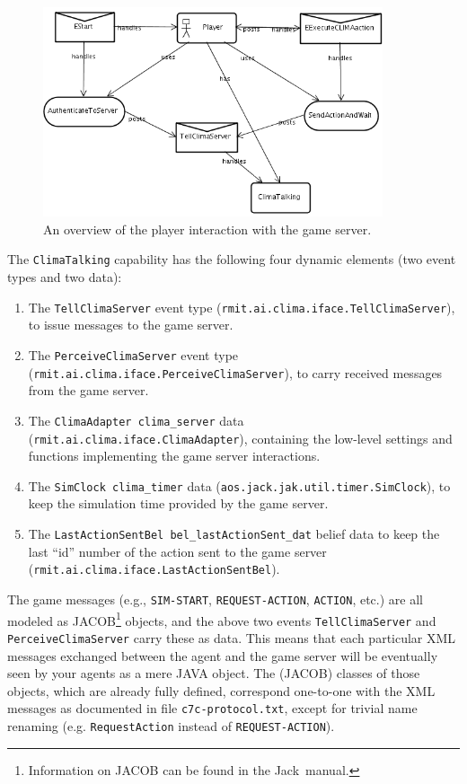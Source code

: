 \documentclass[10pt]{article}
\newcommand{\propername}[1]{\mbox{\sf #1}\xspace}
\newcommand{\JACK}{\propername{Jack}}
\begin{document}
\begin{figure}
\begin{center}
\includegraphics[width=10cm]{ServerInteraction}
\end{center}
\caption{An overview of the player interaction with the game server.}
\label{fig:design_serverinteraction}
\end{figure}


The \texttt{ClimaTalking} capability has the following four dynamic elements
(two event types and two data):
\begin{enumerate}
 \item The \texttt{TellClimaServer} event type
(\texttt{rmit.ai.clima.iface.TellClimaServer}), to issue messages to the
game server.

\item The \texttt{PerceiveClimaServer} event type 
(\texttt{rmit.ai.clima.iface.PerceiveClimaServer}), to carry received messages
from the game server.


\item The \texttt{ClimaAdapter clima\_server} data
(\texttt{rmit.ai.clima.iface.ClimaAdapter}), containing the low-level
settings and functions implementing the game server interactions.

\item The \texttt{SimClock clima\_timer} data
(\texttt{aos.jack.jak.util.timer.SimClock}), to keep the simulation time
provided by the game server.

\item The \texttt{LastActionSentBel bel\_lastActionSent\_dat} belief data to
keep the last ``id'' number of the action sent to the game server
(\texttt{rmit.ai.clima.iface.LastActionSentBel}). 
\end{enumerate}

The game messages (e.g., \texttt{SIM-START}, \texttt{REQUEST-ACTION},
\texttt{ACTION}, etc.) are all modeled as JACOB\footnote{Information on
JACOB can be found in the \JACK\ manual.} objects, and the above two events
\texttt{TellClimaServer} and  \texttt{PerceiveClimaServer} carry these as
data. 
%
This means that each particular  XML messages exchanged between the agent
and the game server will be eventually seen by your agents as a mere
JAVA object. The (JACOB) classes of those objects, which are already fully
defined, correspond one-to-one with the XML messages as documented
in file \texttt{c7c-protocol.txt}, except for trivial name renaming (e.g.
\texttt{RequestAction} instead of \texttt{REQUEST-ACTION}).
\end{document}
